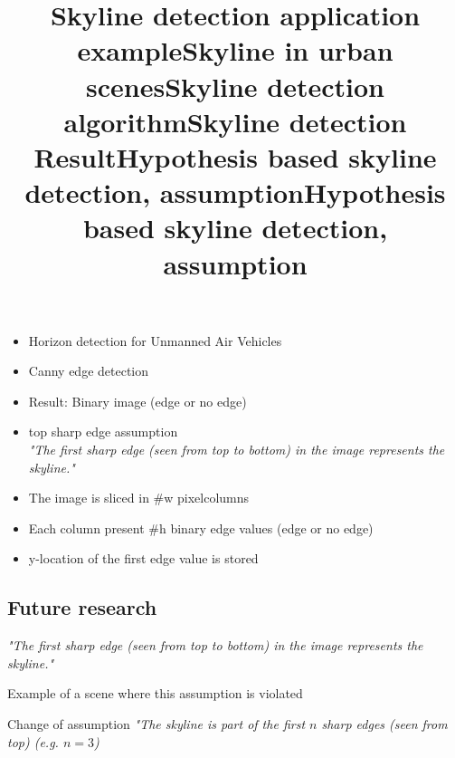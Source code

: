 \title{Skyline detection application example}
\begin{itemize}
	\item Horizon detection for Unmanned Air Vehicles
\end{itemize}

\title{Skyline in urban scenes}%
\begin{itemize}
	\item Canny edge detection 
	\item Result: Binary image (edge or no edge)
	\item top sharp edge assumption\\
	\emph{"The first sharp edge (seen from top to bottom) in the image represents the skyline."}
\end{itemize}


\title{Skyline detection algorithm}%
\begin{itemize}
	\item The image is sliced in #w pixelcolumns
	\item Each column present #h binary edge values (edge or no edge)
	\item y-location of the first edge value is stored 
\end{itemize}



\title{Skyline detection Result}%

\subsection{Future research}
\title{Hypothesis based skyline detection, assumption}
\emph{"The first sharp edge (seen from top to bottom) in the image represents the skyline."}
\item Example of a scene where this assumption is violated

\title{Hypothesis based skyline detection, assumption}
\item Change of assumption
\emph{"The skyline is part of the first $n$ sharp edges (seen from top) (e.g.
$n=3$)}

